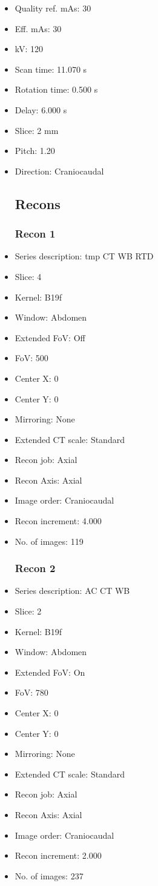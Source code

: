 \documentclass[12pt]{article}
\begin{document}
\begin{itemize}
\subsection{Scan}
\item Quality ref. mAs: 30\item Eff. mAs: 30\item kV: 120\item Scan time: 11.070 s\item Rotation time: 0.500 s\item Delay: 6.000 s\item Slice: 2 mm\item Pitch: 1.20\item Direction: Craniocaudal\subsection{Recons}

\subsubsection{Recon 1}
\item Series description: tmp CT WB RTD
\item Slice: 4
\item Kernel: B19f
\item Window: Abdomen
\item Extended FoV: Off
\item FoV: 500
\item Center X: 0
\item Center Y: 0
\item Mirroring: None
\item Extended CT scale: Standard
\item Recon job: Axial
\item Recon Axis: Axial
\item Image order: Craniocaudal
\item Recon increment: 4.000
\item No. of images: 119
\subsubsection{Recon 2}
\item Series description: AC CT WB
\item Slice: 2
\item Kernel: B19f
\item Window: Abdomen
\item Extended FoV: On
\item FoV: 780
\item Center X: 0
\item Center Y: 0
\item Mirroring: None
\item Extended CT scale: Standard
\item Recon job: Axial
\item Recon Axis: Axial
\item Image order: Craniocaudal
\item Recon increment: 2.000
\item No. of images: 237

\end{itemize}
\end{document}
